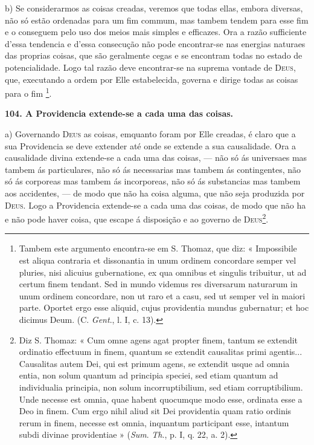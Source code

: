 b) Se considerarmos as coisas creadas, veremos que todas ellas, embora diversas, não só estão ordenadas para um fim commum, mas tambem tendem para esse fim e o conseguem pelo uso dos meios mais simples e efficazes. Ora a razão sufficiente d'essa tendencia e d'essa consecução não pode encontrar-se nas energias naturaes das proprias coisas, que são geralmente cegas e se encontram todas no estado de potencialidade. Logo tal razão deve encontrar-se na suprema vontade de \textsc{Deus}, que, executando a ordem por Elle estabelecida, governa e dirige todas as coisas para o fim \footnote{Tambem este argumento encontra-se em S. Thomaz, que diz: « Impossibile est aliqua contraria et dissonantia in unum ordinem concordare semper vel pluries, nisi alicuius gubernatione, ex qua omnibus et singulis tribuitur, ut ad certum finem tendant. Sed in mundo videmus res diversarum naturarum in unum ordinem concordare, non ut raro et a casu, sed ut semper vel in maiori parte. Oportet ergo esse aliquid, cujus providentia mundus gubernatur; et hoc dicimus Deum. (C. \emph{Gent}., l. I, c. 13).}.

 \textbf{104. A Providencia extende-se a cada uma das coisas.}

a) Governando \textsc{Deus} as coisas, emquanto foram por Elle creadas, é claro que a sua Providencia se deve extender até onde se extende a sua causalidade. Ora a causalidade divina extende-se a cada uma das coisas, --- não só ás universaes mas tambem ás particulares, não só ás necessarias mas tambem ás contingentes, não só ás corporeas mas tambem ás incorporeas, não só ás substancias mas tambem aos accidentes, --- de modo que não ha coisa alguma, que não seja produzida por \textsc{Deus}. Logo a Providencia extende-se a cada uma das coisas, de modo que não ha e não pode haver coisa, que escape á disposição e ao governo de \textsc{Deus}\footnote{Diz S. Thomaz: « Cum omne agens agat propter finem, tantum se extendit ordinatio effectuum in finem, quantum se extendit causalitas primi agentis... Causalitas autem Dei, qui est primum agens, se extendit usque ad omnia entia, non solum quantum ad principia speciei, sed etiam quantum ad individualia principia, non solum incorruptibilium, sed etiam corruptibilium. Unde necesse est omnia, quae habent quocumque modo esse, ordinata esse a Deo in finem. Cum ergo nihil aliud sit Dei providentia quam ratio ordinis rerum in finem, necesse est omnia, inquantum participant esse, intantum subdi divinae providentiae » (\emph{Sum}. \emph{Th}., p. I, q. 22, a. 2).}.

